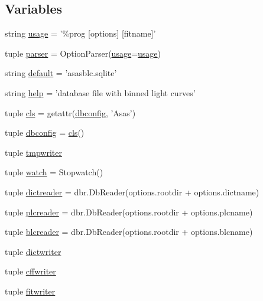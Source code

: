 \subsection*{Variables}
\begin{DoxyCompactItemize}
\item 
string \hyperlink{namespacerunpoly_aac16bfb405f5f32d626a3c0bd057a781}{usage} = '\%prog \mbox{[}options\mbox{]} \mbox{[}fitname\mbox{]}'
\item 
tuple \hyperlink{namespacerunpoly_a366967b50d48b6d7ab51bb4bd156ff40}{parser} = OptionParser(\hyperlink{namespacerunpoly_aac16bfb405f5f32d626a3c0bd057a781}{usage}=\hyperlink{namespacerunpoly_aac16bfb405f5f32d626a3c0bd057a781}{usage})
\item 
string \hyperlink{namespacerunpoly_afb3be1048713b880f7ac5b701514765d}{default} = 'asasblc.sqlite'
\item 
string \hyperlink{namespacerunpoly_a7258195372f4a253f10006e02792d22b}{help} = 'database file with binned light curves'
\item 
tuple \hyperlink{namespacerunpoly_ae53c9938e3373cc687af5896e211fcc4}{cls} = getattr(\hyperlink{namespacerunpoly_a23238d44f53fedb2335ddfd9e0ba563a}{dbconfig}, 'Asas')
\item 
tuple \hyperlink{namespacerunpoly_a23238d44f53fedb2335ddfd9e0ba563a}{dbconfig} = \hyperlink{namespacerunpoly_ae53c9938e3373cc687af5896e211fcc4}{cls}()
\item 
tuple \hyperlink{namespacerunpoly_ac9f61a81e4f1d37afe226eb29a552c68}{tmpwriter}
\item 
tuple \hyperlink{namespacerunpoly_ac573a8d4d7a1ebbf405bd0b69fa9361b}{watch} = Stopwatch()
\item 
tuple \hyperlink{namespacerunpoly_a41be213241b93ac1aaaf0a0dcd1818f2}{dictreader} = dbr.DbReader(options.rootdir + options.dictname)
\item 
tuple \hyperlink{namespacerunpoly_afb96306fccc8888ba0c85e13ab7a5598}{plcreader} = dbr.DbReader(options.rootdir + options.plcname)
\item 
tuple \hyperlink{namespacerunpoly_ac06d4b8419f2f541233264830433e74d}{blcreader} = dbr.DbReader(options.rootdir + options.blcname)
\item 
tuple \hyperlink{namespacerunpoly_a09493fdc135109309376e8ac388a3fde}{dictwriter}
\item 
tuple \hyperlink{namespacerunpoly_a19b081e3078cf18f986b0d40995ddd86}{cffwriter}
\item 
tuple \hyperlink{namespacerunpoly_a270c35c20bdd6aa659cab1358e8f9475}{fitwriter}

\end{DoxyCompactItemize}
